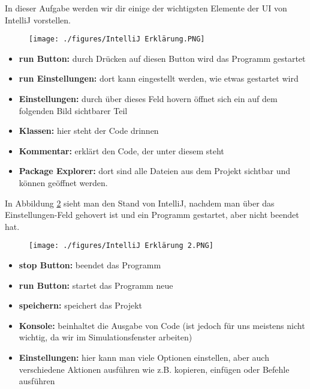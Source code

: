 
\label{ex3}
In dieser Aufgabe werden wir dir einige der wichtigsten Elemente der UI von IntelliJ vorstellen.
\begin{figure}[h]    
    \begin{center}
        \texttt{[image: ./figures/IntelliJ Erklärung.PNG]}
    \end{center}
    \caption{}
    \label{fig:IntelliJUI}
\end{figure}
\begin{itemize}
    \item \textbf{run Button:} durch Drücken auf diesen Button wird das Programm gestartet
    \item \textbf{run Einstellungen:} dort kann eingestellt werden, wie etwas gestartet wird 
    \item \textbf{Einstellungen:} durch über dieses Feld hovern öffnet sich ein auf dem folgenden Bild sichtbarer Teil
    \item \textbf{Klassen:} hier steht der Code drinnen
    \item \textbf{Kommentar:} erklärt den Code, der unter diesem steht
    \item \textbf{Package Explorer:} dort sind alle Dateien aus dem Projekt sichtbar und können geöffnet werden.
\end{itemize}
\newpage
In Abbildung \ref{fig:uisecond} sieht man den Stand von IntelliJ, nachdem man über das Einstellungen-Feld gehovert ist und ein Programm gestartet, aber  nicht beendet hat.
\begin{figure}
    \begin{center}
        \texttt{[image: ./figures/IntelliJ Erklärung 2.PNG]}
    \end{center}
    \caption{}
    \label{fig:uisecond}        
\end{figure}

\begin{itemize}
    \item \textbf{stop Button:} beendet das Programm
    \item \textbf{run Button:} startet das Programm neue
    \item \textbf{speichern:} speichert das Projekt
    \item \textbf{Konsole:} beinhaltet die Ausgabe von Code (ist jedoch für uns meistens nicht wichtig, da wir im Simulationsfenster arbeiten)
    \item \textbf{Einstellungen:} hier kann man viele Optionen einstellen, aber auch verschiedene Aktionen ausführen wie z.B. kopieren, einfügen oder Befehle ausführen
\end{itemize}
\newpage
